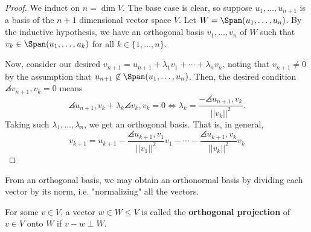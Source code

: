 \begin{proof}
    We induct on $n = \dim V$. The base case is clear, so suppose $u_1,\dots,u_{n+1}$ is a basis of the $n+1$ dimensional vector space $V$. Let $W = \Span(u_1,\dots,u_n)$. By the inductive hypothesis, we have an orthogonal basis $v_1,\dots,v_n$ of $W$ such that $v_k \in \Span(u_1,\dots,u_k)$ for all $k \in \{1,\dots,n\}$.

    Now, consider our desired $v_{n+1}=u_{n+1}+\lambda _1v_1 +\cdots +\lambda_nv_n$, noting that $v_{n+1}\neq 0$ by the assumption that $u_{n+1}\not \in \Span (u_1,\dots,u_n)$. Then, the desired condition $\angles{v_{n+1},v_k}=0$ means
    $$\angles{u_{n+1},v_k}+\lambda_k\angles{v_k,v_k}=0 \iff \lambda_k=\frac{-\angles{u_{n+1},v_k}}{||v_k||^2}.$$
    Taking such $\lambda_1,\dots,\lambda_n$, we get an orthogonal basis. That is, in general,
    $$v_{k+1}=u_{k+1}-\frac{\angles{u_{k+1},v_1}}{||v_1||^2}v_1-\cdots -\frac{\angles{u_{k+1},v_k}}{||v_k||^2}v_k$$
\end{proof}

\begin{rmk}
    From an orthogonal basis, we may obtain an orthonormal basis by dividing each vector by its norm, i.e. "normalizing" all the vectors.
\end{rmk}

\begin{defn}
    For some $v\in V$, a vector $w \in W \leq V$ is called the \textbf{orthogonal projection} of $v \in V$ onto $W$ if $v-w \perp W$.
\end{defn}

